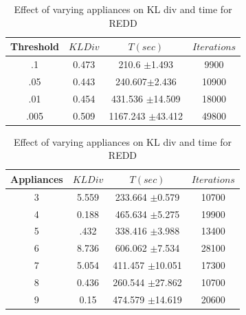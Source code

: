 \documentclass[conference]{IEEEtran}
\begin{document}
\begin{table}[htdp]
\parbox{.51\linewidth}{
\centering
\begin{tabular}{| c | c | c | c |}
\hline
Threshold & $KL Div$ & $T(sec)$ & $Iterations$ \\
\hline
.1 & 0.473 & 210.6 $\pm$1.493 & 9900 \\
.05 & 0.443 & 240.607$\pm$2.436 & 10900 \\
.01 & 0.454 & 431.536 $\pm$14.509 & 18000 \\
.005 & 0.509 & 1167.243 $\pm$43.412 & 49800 \\
\hline
\end{tabular}
\caption{Effect of varying min threshold on KL div and time for REDD}
\label{table:threshold1}
}
\hfill
\parbox{.51\linewidth}{
\centering
\begin{tabular}{| c | c | c | c |}
\hline
Appliances & $KL Div$ & $T(sec)$ & $Iterations$ \\
\hline
3 & 5.559 & 233.664 $\pm$0.579 & 10700 \\
4 & 0.188 & 465.634 $\pm$5.275 & 19900 \\
5 & .432 & 338.416 $\pm$3.988  & 13400 \\
6 & 8.736 & 606.062 $\pm$7.534 & 28100 \\
7 & 5.054 & 411.457 $\pm$10.051 & 17300 \\
8 & 0.436 & 260.544 $\pm$27.862 & 10700 \\
9 & 0.15 & 474.579 $\pm$14.619 & 20600 \\
\hline
\end{tabular}
\caption{Effect of varying appliances on KL div and time for REDD}
\label{table:appliance1}
}
\end{table}
\end{document}

